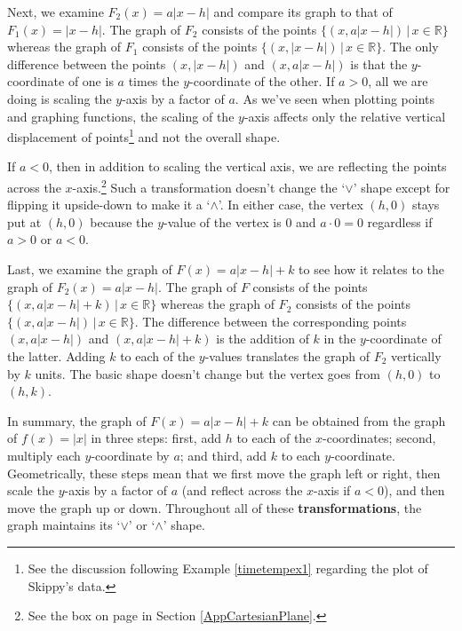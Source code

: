 \documentclass{ximera}
\begin{document}
\medskip

Next, we examine $F_{2}(x) = a|x - h|$ and compare its graph to that of $F_{1}(x) = |x - h|$.  The graph of $F_{2}$ consists of the points $\{ (x, a|x - h|) \, | \, x \in \mathbb{R} \}$ whereas the graph of $F_{1}$ consists of the points $\{ (x, |x - h|) \, | \, x \in \mathbb{R} \}$.  The only difference between the points $(x, |x - h|)$ and $(x, a|x - h|)$ is that the $y$-coordinate of one is $a$ times the $y$-coordinate of the other.   If $a > 0$, all we are doing is scaling the $y$-axis by a factor of $a$.  As we've seen when plotting points and graphing functions, the scaling of the $y$-axis affects only the relative vertical displacement of points\footnote{See the discussion following Example \ref{timetempex1} regarding the plot of Skippy's data.} and not the overall shape.   

\medskip

If $a < 0$, then in addition to scaling the vertical axis, we are reflecting the points across the $x$-axis.\footnote{See the box on page \pageref{reflectionsinabox} in Section \ref{AppCartesianPlane}.} Such a transformation doesn't change the `$\vee$' shape except for flipping it upside-down to make it a `$\wedge$'.  In either case, the vertex $(h, 0)$ stays put at $(h, 0)$ because the $y$-value of the vertex is $0$ and $a \cdot 0 = 0$ regardless if $a > 0$ or $a < 0$.

\medskip

Last, we examine the graph of $F(x) = a|x - h| + k$ to see how it relates to the graph of $F_{2}(x) = a|x - h|$.  The graph of $F$ consists of the points $\{ (x, a|x - h| + k ) \, | \, x \in \mathbb{R} \}$ whereas the graph of $F_{2}$ consists of the points $\{ (x, a|x - h|) \, | \, x \in \mathbb{R} \}$.  The difference between the corresponding points $(x, a|x - h|)$ and $(x, a|x - h| + k )$ is the addition of $k$ in the $y$-coordinate of the latter.  Adding $k$ to each of the $y$-values translates the graph of $F_{2}$ vertically by $k$ units.  The basic shape doesn't change but the vertex goes from $(h, 0)$ to $(h, k)$.

\medskip

In summary, the graph of $F(x) = a|x - h| + k$ can be obtained from the graph of $f(x) = |x|$ in three steps:  first, add $h$ to each of the $x$-coordinates;  second, multiply each $y$-coordinate by $a$; and third, add $k$ to each $y$-coordinate.  Geometrically, these steps mean that we first move the graph left or right, then scale the $y$-axis by a factor of $a$ (and reflect across the $x$-axis if $a < 0$), and then move the graph up or down.  Throughout all of these \textbf{transformations}, the graph maintains its `$\vee$' or `$\wedge$' shape.
\end{document}
